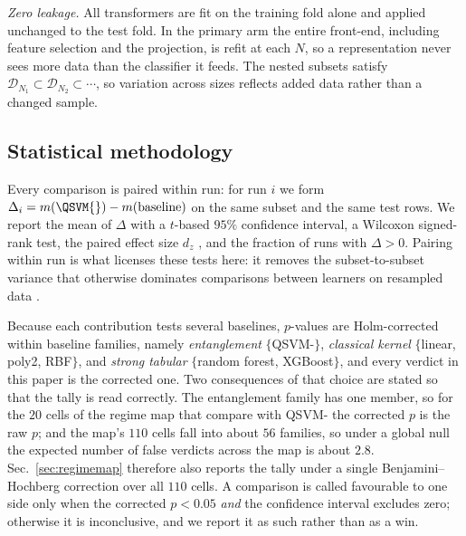 \begin{revbody}
\emph{Zero leakage.} All transformers are fit on the training fold alone and
applied unchanged to the test fold. In the primary arm the entire front-end,
including feature selection and the projection, is refit at each $N$, so a
representation never sees more data than the classifier it feeds. The nested
subsets satisfy $\mathcal{D}_{N_1}\subset\mathcal{D}_{N_2}\subset\cdots$, so
variation across sizes reflects added data rather than a changed sample.
\end{revbody}

\subsection{Statistical methodology}
\label{sec:stats}
\begin{revbody}

Every comparison is paired within run: for run $i$ we form
$\Delta_i = m(\text{\QSVM{}}) - m(\text{baseline})$ on the same subset and the
same test rows. We report the mean of $\Delta$ with a $t$-based $95\%$
confidence interval, a Wilcoxon signed-rank test, the paired effect size $d_z$
\cite{ref32}, and the fraction of runs with $\Delta>0$. Pairing within run is
what licenses these tests here: it removes the subset-to-subset variance that
otherwise dominates comparisons between learners on resampled data \cite{ref31}.

Because each contribution tests several baselines, $p$-values are Holm-corrected
within baseline families, namely \emph{entanglement} $\{$QSVM-\Zmap{}$\}$,
\emph{classical kernel} $\{$linear, poly2, RBF$\}$, and \emph{strong tabular}
$\{$random forest, XGBoost$\}$, and every verdict in this paper is the
corrected one. Two consequences of that choice are stated so that the tally is
read correctly. The entanglement family has one member, so for the $20$ cells
of the regime map that compare \QSVM{} with QSVM-\Zmap{} the corrected $p$ is
the raw $p$; and the map's $110$ cells fall into about $56$ families, so under
a global null the expected number of false verdicts across the map is about
$2.8$. Sec.~\ref{sec:regimemap} therefore also reports the tally under a single
Benjamini--Hochberg correction over all $110$ cells. A comparison is called
favourable to one side only when the corrected $p<0.05$ \emph{and} the
confidence interval excludes zero; otherwise it is inconclusive, and we report
it as such rather than as a win.
\end{revbody}

